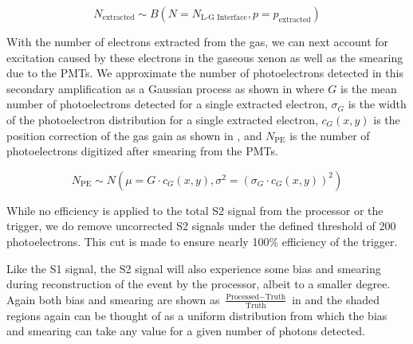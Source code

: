 \begin{equation}
        \label{eqn:xe1t_binomial_ee}
        N_{\textrm{extracted}} \sim B \left( N= N_{\textrm{L-G Interface}}, p=p_{\textrm{extracted}} \right)
\end{equation}


With the number of electrons extracted from the gas, we can next account for excitation caused by these electrons in the gaseous xenon as well as the smearing due to the PMTs.  We approximate the number of photoelectrons detected in this secondary amplification as a Gaussian process as shown in  where $G$ is the mean number of photoelectrons detected for a single extracted electron, $\sigma_G$ is the width of the photoelectron distribution for a single extracted electron, $c_{G}(x, y)$ is the position correction of the gas gain as shown in , and $N_{\textrm{PE}}$ is the number of photoelectrons digitized after smearing from the PMTs.

\begin{equation}
        \label{eqn:xe1t_gas_gain}
        N_{\textrm{PE}} \sim N(\mu=G \cdot c_{G}(x, y), \sigma^2=(\sigma_G \cdot c_{G}(x, y))^2)
\end{equation}


While no efficiency is applied to the total S2 signal from the processor or the trigger, we do remove uncorrected S2 signals under the defined threshold of 200 photoelectrons.  This cut is made to ensure nearly 100\% efficiency of the trigger.



Like the S1 signal, the S2 signal will also experience some bias and smearing during reconstruction of the event by the processor, albeit to a smaller degree.  Again both bias and smearing are shown as $\frac{\textrm{Processed} - \textrm{Truth}}{\textrm{Truth}}$ in  and the shaded regions again can be thought of as a uniform distribution from which the bias and smearing can take any value for a given number of photons detected.  

